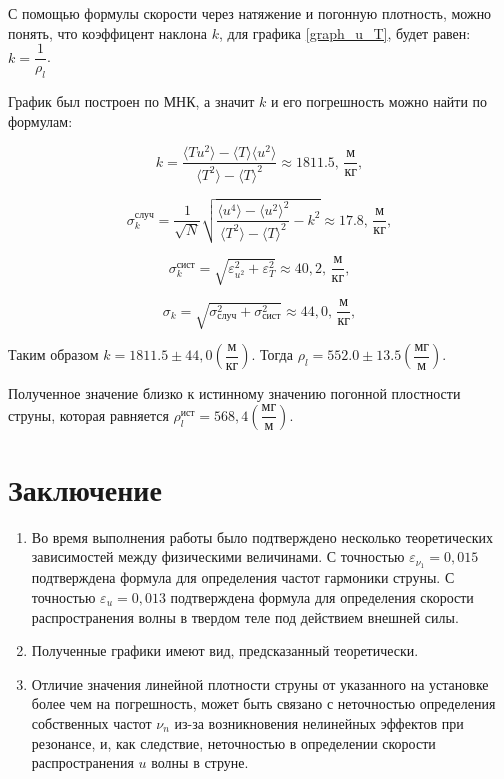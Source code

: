 \documentclass[
a4paper, %
12pt, %
]{article}
\begin{document}
	С помощью формулы скорости через натяжение и погонную плотность, можно понять, что коэффицент наклона $k$, для графика \ref{graph_u_T}, будет равен: $k = \dfrac{1}{\rho_l}$.
	
	График был построен по МНК, а значит $k$ и его погрешность можно найти по формулам:
	
	\begin{equation}
		k=\frac{\langle Tu^2\rangle-\langle T\rangle \langle u^2\rangle}{\langle T^2\rangle - \langle T\rangle^2} \approx 1811.5 \text{, $\dfrac{\text{м}}{\text{кг}}$},
	\end{equation}
	
	\begin{equation}
		\sigma_k^\text{случ}=\frac{1}{\sqrt{N}}\sqrt{\frac{\langle u^4 \rangle - \langle u^2 \rangle^2}{\langle T^2 \rangle - \langle T \rangle^2} - k^2  } \approx 17.8 \text{, $\dfrac{\text{м}}{\text{кг}}$},
	\end{equation}
	
	\begin{equation}
		\sigma_k^{\text{сист}} = \sqrt{ \varepsilon_{u^2}^2 + \varepsilon_T^2 } \approx 40,2\text{, $\dfrac{\text{м}}{\text{кг}}$},
	\end{equation}
	
	\begin{equation}
		\sigma_k = \sqrt{\sigma_\text{случ}^2 + \sigma_\text{сист}^2} \approx 44,0 \text{, $\dfrac{\text{м}}{\text{кг}}$},
	\end{equation}
	
	Таким образом $k = 1811.5 \pm 44,0 \left({ \dfrac{\text{м}}{\text{кг}}}\right) $.
	Тогда $\rho_l = 552.0 \pm 13.5 \left({ \dfrac{\text{мг}}{\text{м}}}\right)$.
	
	Полученное значение близко к истинному значению погонной плостности струны, которая равняется $\rho^{\text{ист}}_l = 568,4\left({ \dfrac{\text{мг}}{\text{м}}}\right) $. 
	
	\newpage
	
	\section{Заключение}
	\begin{enumerate}
		\item
		Во время выполнения работы было подтверждено несколько теоретических зависимостей между физическими величинами. С точностью $\varepsilon_{\nu_{1}} = 0,015$ подтверждена формула для определения частот гармоники струны. С точностью  $\varepsilon_{u} = 0,013$ подтверждена формула для определения скорости распространения волны в твердом теле под действием внешней силы.
		\item
		Полученные графики имеют вид, предсказанный теоретически.
		\item
		Отличие значения линейной плотности струны от указанного на установке более чем на погрешность, может быть связано с неточностью определения собственных частот $\nu_n$ из-за возникновения нелинейных эффектов при резонансе, и, как следствие, неточностью в определении скорости распространения $u$ волны в струне.
	\end{enumerate}
	
	
\end{document}
